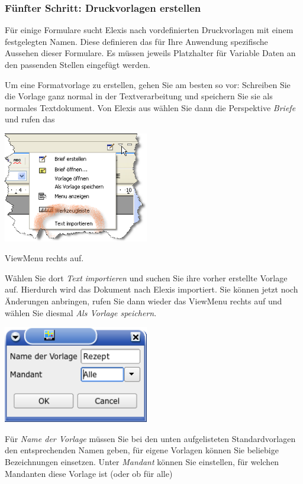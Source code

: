 \subsubsection{Fünfter Schritt: Druckvorlagen erstellen}
Für einige Formulare sucht Elexis nach vordefinierten Druckvorlagen mit einem festgelegten Namen. Diese definieren das für Ihre Anwendung spezifische Aussehen dieser Formulare. Es müssen jeweils Platzhalter für Variable Daten an den passenden Stellen eingefügt werden.

Um eine Formatvorlage zu erstellen, gehen Sie am besten so vor: Schreiben Sie die Vorlage ganz normal in der Textverarbeitung und speichern Sie sie als normales Textdokument. Von Elexis aus wählen Sie dann die Perspektive \textit{Briefe} und rufen das

\includegraphics[width=2.5in]{images/import.png}

ViewMenu rechts auf.

Wählen Sie dort \textit{Text importieren} und suchen Sie ihre vorher erstellte Vorlage auf.
 Hierdurch wird das Dokument nach Elexis importiert. Sie können jetzt noch Änderungen anbringen, rufen Sie dann wieder das ViewMenu rechts auf und wählen Sie diesmal \textit{Als Vorlage speichern}.

\includegraphics[width=2.5in]{images/rezept1.png}

Für \textit{Name der Vorlage} müssen Sie bei den unten aufgelisteten Standardvorlagen den entsprechenden Namen geben, für eigene Vorlagen können Sie beliebige Bezeichnungen einsetzen. Unter \textit{Mandant} können Sie einstellen, für welchen Mandanten diese Vorlage ist (oder ob für alle)

